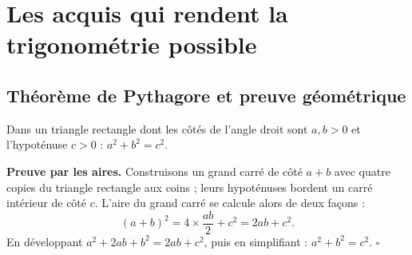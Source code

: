 \documentclass[../cours_spe_trigo.tex]{subfiles}
\begin{document}
\setcounter{chapter}{1}
\chapter{Les acquis qui rendent la trigonométrie possible}
\section{Théorème de Pythagore et preuve géométrique}
\begin{propriete}
Dans un triangle rectangle dont les côtés de l'angle droit sont $a,b>0$ et l'hypoténuse $c>0$ : $\boxed{a^2+b^2=c^2}$.
\end{propriete}
\begin{demonstration}
\textbf{Preuve par les aires.} Construisons un grand carré de côté $a+b$ avec quatre copies du triangle rectangle aux coins ; leurs hypoténuses bordent un carré intérieur de côté $c$. L'aire du grand carré se calcule alors de deux façons :
\[(a+b)^2=4\times\frac{ab}{2}+c^2=2ab+c^2.\]
En développant $a^2+2ab+b^2=2ab+c^2$, puis en simplifiant : $a^2+b^2=c^2$. $\square$
\end{demonstration}
\begin{center}
\end{center}
\end{document}

